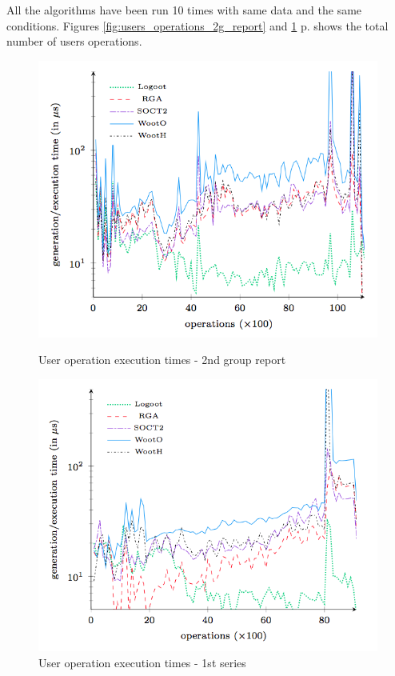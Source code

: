 All the algorithms have been run 10 times with same data and the same conditions. Figures \ref{fig:users_operations_2g_report} and \ref{fig:users_operations_1t_big} p.\pageref{fig:users_operations_2g_report} shows the total number of users operations.\\

\begin{figure}[h!]
\begin{minipage}{0.50\linewidth}
  \includegraphics[width=1.2\textwidth]{includes/users_operations_2g_report.png}
  \caption{User operation execution times - 2nd group
report}
  \label{fig:users_operations_2g_report}
  \end{minipage} \hfill
  \begin{minipage}{.50\linewidth}
    \includegraphics[width=1.2\textwidth]{includes/users_operations_1t_big.png}
  	\caption{User operation execution times - 1st series}
  	\label{fig:users_operations_1t_big}
\end{minipage} \hfill
\end{figure}

